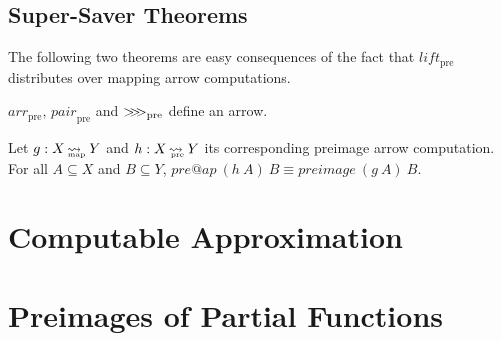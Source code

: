 \documentclass[preprint]{sigplanconf}
\newcommand{\arrow}{\rightsquigarrow}
\newcommand{\arrowlift}{\ensuremath{lift}}
\newcommand{\arrowarr}{\ensuremath{arr}}
\newcommand{\arrowcomp}{\ensuremath{{>}\mspace{-6mu}{>}\mspace{-6mu}{>}}}
\newcommand{\arrowpair}{\ensuremath{pair}}
\newcommand{\map}{_\mathrm{map}}
\DeclareMathOperator{\mapto}{\arrow_{\mspace{-21mu}\map}}
\newcommand{\pre}{_\mathrm{pre}}
\DeclareMathOperator{\preto}{\arrow_{\mspace{-19mu}\pre}}
\newcommand{\liftpre}{\arrowlift\pre}
\newcommand{\arrpre}{\arrowarr\pre}
\newcommand{\comppre}{\arrowcomp\pre}
\newcommand{\pairpre}{\arrowpair\pre}
\begin{document}
\subsection{Super-Saver Theorems}

The following two theorems are easy consequences of the fact that $\liftpre$ distributes over mapping arrow computations.

\begin{corollary}
$\arrpre$, $\pairpre$ and $\comppre$ define an arrow.
\end{corollary}

\begin{corollary}
Let $g : X \mapto Y$ and $h : X \preto Y$ its corresponding preimage arrow computation.
For all $A \subseteq X$ and $B \subseteq Y$, $pre@ap~(h~A)~B \equiv preimage~(g~A)~B$.
\end{corollary}

\section{Computable Approximation}


\section{Preimages of Partial Functions}







\end{document}
